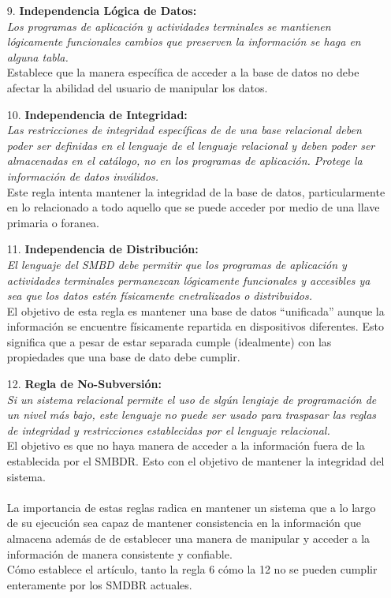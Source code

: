 \documentclass[a4paper, 12pt]{report}
\begin{document}
{\begin{enumerate}
{    El objetivo es que el almacenamiento de los datos sea independiente del
    programa que los requiere pero asegurando que pueden ser accedidos de la
    misma manera.
}
\item[9.]{\textbf{Independencia Lógica de Datos:}\\\textit{
    Los programas de aplicación y actividades terminales se mantienen lógicamente
    funcionales cambios que preserven la información se haga en alguna tabla.}\\
    Establece que la manera específica de acceder a la base de datos no debe afectar
    la abilidad del usuario de manipular los datos.
}
\item[10.]{\textbf{Independencia de Integridad:}\\\textit{
    Las restricciones de integridad específicas de de una base relacional deben
    poder ser definidas en el lenguaje de el lenguaje relacional y deben poder
    ser almacenadas en el catálogo, no en los programas de aplicación. Protege la
    información de datos inválidos.}\\
    Este regla intenta mantener la integridad de la base de datos, particularmente
    en lo relacionado a todo aquello que se puede acceder por medio de una llave
    primaria o foranea.
}
\item[11.]{\textbf{Independencia de Distribución:}\\\textit{
    El lenguaje del SMBD debe permitir que los programas de aplicación y actividades
    terminales permanezcan lógicamente funcionales y accesibles ya sea que los datos
    estén físicamente cnetralizados o distribuidos.}\\
    El objetivo de esta regla es mantener una base de datos ``unificada'' aunque
    la información se encuentre físicamente repartida en dispositivos diferentes.
    Esto significa que a pesar de estar separada cumple (idealmente) con las
    propiedades que una base de dato debe cumplir.
}
\item[12.]{\textbf{Regla de No-Subversión:}\\\textit{
    Si un sistema relacional permite el uso de slgún lengiaje de programación de
    un nivel más bajo, este lenguaje no puede ser usado para traspasar las reglas
    de integridad y restricciones establecidas por el lenguaje relacional.}\\
    El objetivo es que no haya manera de acceder a la información fuera de la
    establecida por el SMBDR. Esto con el objetivo de mantener la integridad
    del sistema.\\\\
}
La importancia de estas reglas radica en mantener un sistema que a lo largo de su
ejecución sea capaz de mantener consistencia en la información que almacena además
de de establecer una manera de manipular y acceder a la información de manera
consistente y confiable.\\
Cómo establece el artículo, tanto la regla 6 cómo la 12 no se pueden cumplir
enteramente por los SMDBR actuales.

\end{enumerate}
}
\end{document}
